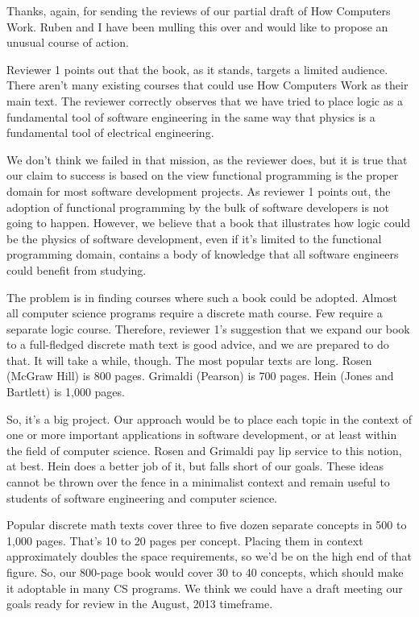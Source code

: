 \documentclass[letterpaper,10pt,extrafontsizesmtwoside,onecolumn,openright,fleqn]{memoir}
\begin{document}
Thanks, again, for sending the reviews of our partial draft of How Computers Work. Ruben and I have been mulling this over and would like to propose an unusual course of action.

Reviewer  1 points out that the book, as it stands, targets a limited audience. There aren't many existing courses that could use How Computers Work as their main text. The reviewer correctly observes that we have tried to place logic as a fundamental tool of software engineering in the same way that physics is a fundamental tool of electrical engineering.

We don't think we failed in that mission, as the reviewer does, but it is true that our claim to success is based on the view functional programming is the proper domain for most software development projects. As reviewer 1 points out, the adoption of functional programming by the bulk of software developers is not going to happen. However, we believe that a book that illustrates how logic could be the physics of software development, even if it's limited to the functional programming domain, contains a body of knowledge that all software engineers could benefit from studying.

The problem is in finding courses where such a book could be adopted. Almost all computer science programs require a discrete math course. Few require a separate logic course. Therefore, reviewer  1's suggestion that we expand our book to a full-fledged discrete math text is good advice, and we are prepared to do that. It will take a while, though. The most popular texts are long. Rosen (McGraw Hill) is 800 pages. Grimaldi (Pearson) is 700 pages. Hein (Jones and Bartlett) is 1,000 pages.

So, it's a big project. Our approach would be to place each topic in the context of one or more important applications in software development, or at least within the field of computer science. Rosen and Grimaldi pay lip service to this notion, at best. Hein does a better job of it, but falls short of our goals. These ideas cannot be thrown over the fence in a minimalist context and remain useful to students of software engineering and computer science.

Popular discrete math texts cover three to five dozen separate concepts in 500 to 1,000 pages. That's 10 to 20 pages per concept. Placing them in context approximately doubles the space requirements, so we'd be on the high end of that figure. So, our 800-page book would cover 30 to 40 concepts, which should make it adoptable in many CS programs. We think we could have a draft meeting our goals ready for review in the August, 2013 timeframe.
\end{document}
